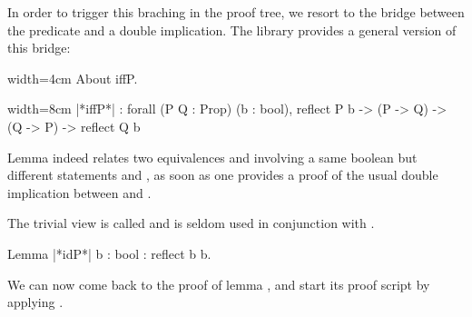 
In order to trigger this braching in the proof tree, we resort to the
bridge between the  predicate and a double implication.
The  library provides a general version of
this bridge:

\begin{coq}{}{width=4cm}
About iffP.
\end{coq}
\begin{coqout}{}{width=8cm}
|*iffP*| : forall (P Q : Prop) (b : bool),
  reflect P b -> (P -> Q) -> (Q -> P) -> reflect Q b
\end{coqout}
Lemma  indeed relates two equivalences 
and  involving a same boolean  but different
 statements  and , as soon as one
provides a proof of the usual double implication between  and
. 

The trivial view is called  and is seldom used
in conjunction with .

\begin{coq}{}{}
Lemma |*idP*| {b : bool} : reflect b b.
\end{coq}
We can now come back to the proof of lemma , and start its
proof script by applying .

